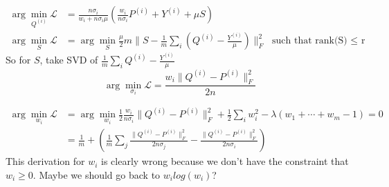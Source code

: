 \documentclass[11pt]{article}
\begin{document}
\begin{align*}
\arg \min_{Q^{(i)}} \mathcal{L} &= \frac{n\sigma_i}{w_i + n\sigma_i \mu}
\left(
\frac{w_i}{n\sigma_i} P^{(i)} + Y^{(i)} + \mu S
\right)\\
\arg \min_S \mathcal{L} &= \arg \min_S \frac{\mu}{2} m\|S - \frac{1}{m} \sum_i (Q^{(i)} - \frac{Y^{(i)} } {\mu}) \|_F^2 \text{   such that rank(S) $\leq$ r}
\end{align*}
So for $S$, take SVD of $\frac{1}{m} \sum_i Q^{(i)} - \frac{Y^{(i)}}{\mu}$
$$\arg \min_{\sigma_i} \mathcal{L} = \frac{w_i \|Q^{(i)}-P^{(i)}\|_F^2}{2n}$$

\begin{align*}
\arg \min_{w_i} \mathcal{L} &= \arg\min_{w_i} \frac{1}{2} \frac{w_i}{n\sigma_i} \|Q^{(i)}-P^{(i)}\|_F^2 + \frac{1}{2} \sum_i w_i^2 - \lambda (w_1 + \cdots + w_m - 1) = 0\\
&= \frac{1}{m} + \left(
\frac{1}{m} \sum_j \frac{\|Q^{(i)}-P^{(i)}\|_F^2}{2n\sigma_j} -
\frac{\|Q^{(i)}-P^{(i)}\|_F^2}{2n\sigma_i} 
\right)
\end{align*}
This derivation for $w_i$ is clearly wrong because we don't have the constraint that $w_i \geq 0$. Maybe we should go back to $w_i log(w_i)$? 


\end{document}
